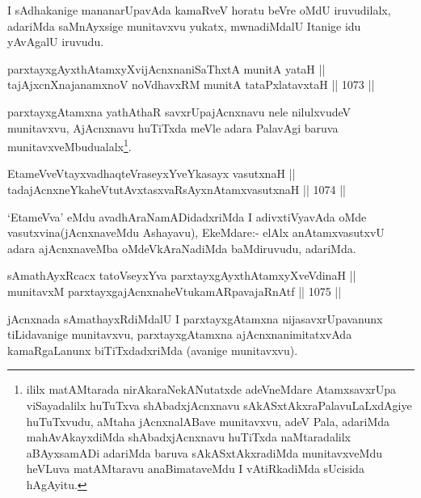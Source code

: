 \begin{artha}
I sAdhakanige mananarUpavAda kamaRveV horatu beVre oMdU iruvudilalx, adariMda saMnAyxsige munitavxvu yukatx, mwnadiMdalU Itanige idu yAvAgalU iruvudu.
\end{artha}


\begin{shl}
parxtayxgAyxthAtamxyXvijAcnxnaniSaThxtA munitA yataH || \\
tajAjxcnXnajanamxnoV noVdhavxRM munitA tataPxlatavxtaH \hfill || 1073 ||  
\end{shl}

\begin{artha}
parxtayxgAtamxna yathAthaR savxrUpajAcnxnavu nele nilulxvudeV munitavxvu, AjAcnxnavu huTiTxda meVle adara PalavAgi baruva munitavxveMbudualalx\footnote{ililx matAMtarada nirAkaraNekANutatxde adeVneMdare AtamxsavxrUpa viSayadalilx huTuTxva shAbadxjAcnxnavu sAkASxtAkxraPalavuLaLxdAgiye huTuTxvudu, aMtaha jAcnxnalABave munitavxvu, adeV Pala, adariMda mahAvAkayxdiMda shAbadxjAcnxnavu huTiTxda naMtaradalilx aBAyxsamADi adariMda baruva sAkASxtAkxradiMda munitavxveMdu heVLuva matAMtaravu anaBimataveMdu I vAtiRkadiMda sUcisida hAgAyitu.}.
\end{artha}

\begin{shl}
EtameVveVtayxvadhaqteVraseyxYveYkasayx vasutxnaH || \\
tadajAcnxneYkaheVtutAvxtasxvaRsAyxnAtamxvasutxnaH \hfill || 1074 ||  
\end{shl}

\begin{artha}
`EtameVva' eMdu avadhAraNamADidadxriMda I adivxtiVyavAda oMde vasutxvina(jAcnxnaveMdu Ashayavu), EkeMdare:- elAlx anAtamxvasutxvU adara ajAcnxnaveMba oMdeVkAraNadiMda baMdiruvudu, adariMda.
\end{artha}

\begin{shl}
sAmathAyxRcacx tatoV\s seyxYva parxtayxgAyxthAtamxyXveVdinaH ||  \\
munitavxM parxtayxgajAcnxnaheVtukamARpavajaRnAtf \hfill || 1075 ||  
\end{shl}

\begin{artha}
jAcnxnada sAmathayxRdiMdalU I parxtayxgAtamxna nijasavxrUpavanunx tiLidavanige munitavxvu, parxtayxgAtamxna ajAcnxnanimitatxvAda kamaRgaLanunx biTiTxdadxriMda (avanige munitavxvu).
\end{artha}

